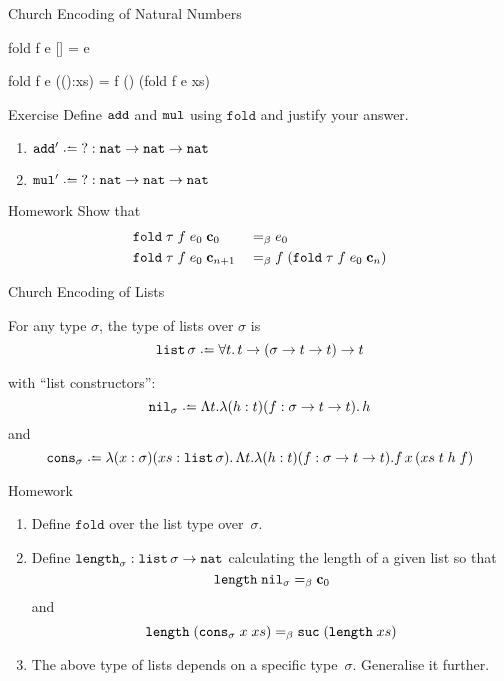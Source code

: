 \begin{frame}[allowframebreaks]{Church Encoding of Natural Numbers}
\begin{semiverbatim}
  fold f e []            = e

  fold f e (():xs) = f () (fold f e xs)
\end{semiverbatim}

\begin{block}{Exercise}
  Define $\mathtt{add}$ and $\mathtt{mul}$ using $\mathtt{fold}$ and justify your
  answer.
  
  \begin{enumerate}
    \item $\add'\defeq \;? : \nat\to\nat\to\nat$
    \item $\mul'\defeq \;? : \nat\to\nat\to\nat$
  \end{enumerate}
\end{block}

\begin{block}{Homework}
  Show that
  \begin{align*}
    & \mathtt{fold}\;\tau\;f\;e_0\;\mathbf{c}_0 && =_\beta e_0 \\
    & \mathtt{fold}\;\tau\;f\;e_0\;\mathbf{c}_{n + 1} && =_\beta
    f\;(\mathtt{fold}\;\tau\;f\;e_0\;\mathbf{c}_n)
  \end{align*}
\end{block}
\framebreak
\end{frame}

\begin{frame}[allowframebreaks]{Church Encoding of Lists}
\begin{definition}
  For any type $\sigma$, the type of lists over $\sigma$ is 
\[
  \List\,\sigma\defeq \forall t.\, t \to (\sigma \to t \to t) \to t 
\]
\end{definition}
with ``list constructors'':
\[
  \mathtt{nil}_\sigma \defeq \Lambda t.\lambda (h : t)(f : \sigma\to t \to t).\,
  h
\]
and  
\[
  \mathtt{cons}_\sigma \defeq \lambda (x : \sigma)(xs : \List\,
  \sigma).\,\Lambda t.\lambda(h : t)(f : \sigma\to t \to t).f\,x\,(xs\; t\;
  h\; f)
\]

\framebreak
\begin{block}{Homework}
\begin{enumerate}
  \item Define $\mathtt{fold}$ over the list type over~$\sigma$.
  \item Define $\mathtt{length}_{\sigma} : \mathtt{list}\,\sigma \to \mathtt{nat}$ calculating
    the length of a given list so that
    \[
      \mathtt{length}\;\mathtt{nil}_\sigma =_\beta \mathbf{c}_0
    \]
    and
    \[
      \mathtt{length}\;(\mathtt{cons}_\sigma\;x\;xs)
      =_\beta \mathtt{suc}\;(\mathtt{length}\;xs) 
    \]
  \item The above type of lists depends on a specific
    type~$\sigma$. Generalise it further. 
  \end{enumerate}
  
\end{block}
\framebreak

\end{frame}

